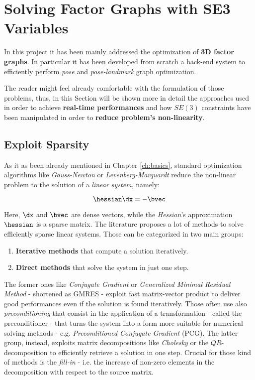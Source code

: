 \chapter{Solving Factor Graphs with SE3 Variables}\label{ch:solvingSE3}

In this project it has been mainly addressed the optimization of \textbf{3D factor graphs}. In particular it has been developed from scratch a back-end system to efficiently perform \textit{pose} and \textit{pose-landmark} graph optimization.

The reader might feel already comfortable with the formulation of those problems, thus, in this Section will be shown more in detail the approaches used in order to achieve \textbf{real-time performances} and how $SE(3)$ constraints have been manipulated in order to \textbf{reduce problem's non-linearity}. 

\section{Exploit Sparsity}\label{sec:sparsity}
As it as been already mentioned in Chapter \ref{ch:basics}, standard optimization algorithms like \textit{Gauss-Newton} or \textit{Levenberg-Marquardt} reduce the non-linear problem to the solution of a \textit{linear system}, namely:

\begin{equation*}
    \hessian \dx = -\bvec
\end{equation*}

\noindent Here, $\dx$ and $\bvec$ are dense vectors, while the \textit{Hessian}'s approximation $\hessian$ is a sparse matrix. The literature proposes a lot of methods to solve efficiently sparse linear systems. Those can be categorized in two main groups:

\begin{enumerate}
    \item \textbf{Iterative methods} \cite{saad2003iterativeSPsolvers} that compute a solution iteratively.
    \item \textbf{Direct methods} \cite{davis2006directSPsolvers} that solve the system in just one step.
\end{enumerate}

\noindent The former ones like \textit{Conjugate Gradient} or \textit{Generalized Minimal Residual Method} - shortened as GMRES - exploit fast matrix-vector product to deliver good performances even if the solution is found iteratively. Those often use also \textit{preconditioning} that consist in the application of a transformation - called the preconditioner - that turns the system into a form more suitable for numerical solving methods - e.g. \textit{Preconditioned Conjugate Gradient} (PCG). The latter group, instead, exploits matrix decompositions like \textit{Cholesky} or the $QR$-decomposition to efficiently retrieve a solution in one step. Crucial for those kind of methods is the \textit{fill-in} - i.e. the increase of non-zero elements in the decomposition with respect to the source matrix. 

